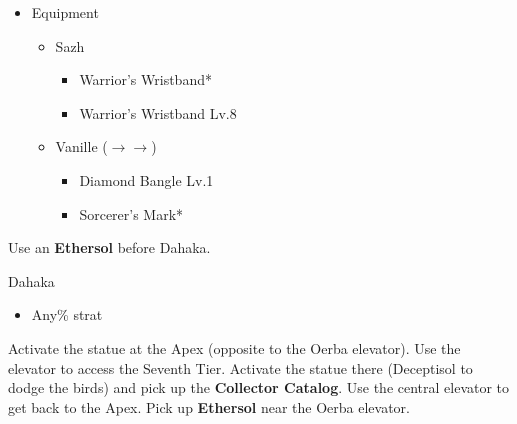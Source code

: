 \begin{menu}
	\begin{itemize}
		\item Equipment
			\begin{itemize}
				\item Sazh
					\begin{itemize}
						\item Warrior's Wristband*
						\item Warrior's Wristband Lv.8
					\end{itemize}
				\item Vanille ($\rightarrow\rightarrow$)
					\begin{itemize}
						\item Diamond Bangle Lv.1
						\item Sorcerer's Mark*
					\end{itemize}
			\end{itemize}
	\end{itemize}
\end{menu}

Use an \textbf{Ethersol} before Dahaka.

\begin{battle}{Dahaka}
	\begin{itemize}
		\item Any\% strat
	\end{itemize}
\end{battle}

Activate the statue at the Apex (opposite to the Oerba elevator).
Use the elevator to access the Seventh Tier.
Activate the statue there (Deceptisol to dodge the birds) and pick up the \textbf{Collector Catalog}.
Use the central elevator to get back to the Apex.
Pick up \textbf{Ethersol} near the Oerba elevator.

